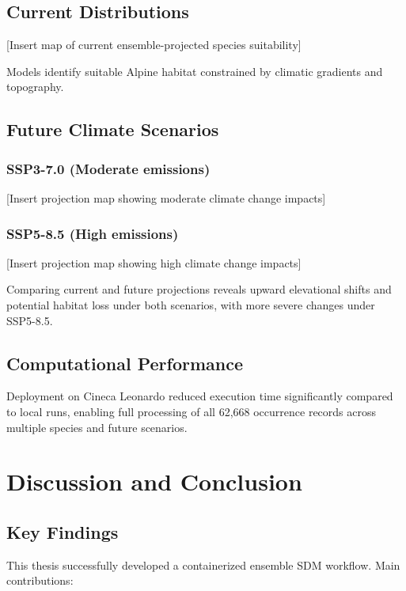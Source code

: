 \documentclass[12pt,a4paper]{report}
\begin{document}
\section{Current Distributions}

[Insert map of current ensemble-projected species suitability]

Models identify suitable Alpine habitat constrained by climatic gradients and topography.

\section{Future Climate Scenarios}

\subsection{SSP3-7.0 (Moderate emissions)}
[Insert projection map showing moderate climate change impacts]

\subsection{SSP5-8.5 (High emissions)}
[Insert projection map showing high climate change impacts]

Comparing current and future projections reveals upward elevational shifts and potential habitat loss under both scenarios, with more severe changes under SSP5-8.5.

\section{Computational Performance}

Deployment on Cineca Leonardo reduced execution time significantly compared to local runs, enabling full processing of all 62,668 occurrence records across multiple species and future scenarios.

\chapter{Discussion and Conclusion}

\section{Key Findings}

This thesis successfully developed a containerized ensemble SDM workflow. Main contributions:
\end{document}
